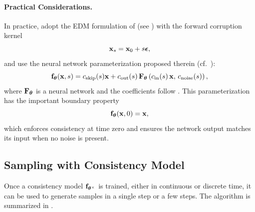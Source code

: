 \paragraph{Practical Considerations.}
In practice, \citet{song2023consistency} adopt the EDM formulation
of \citet{karras2022elucidating} (see ) with the forward corruption
kernel
\[
    {\mathbf{x}}_s = {\mathbf{x}}_0 + s \bm{\epsilon},
\]
and use the neural network parameterization proposed therein
(cf.\ ):
\[
    {\mathbf{f}}_{\bm{\theta}}({\mathbf{x}}, s)
    = c_{\mathrm{skip}}(s) {\mathbf{x}}
      + c_{\mathrm{out}}(s)\,
        {\mathbf{F}}_{\bm{\theta}} \left(c_{\mathrm{in}}(s)\,{\mathbf{x}},\, c_{\mathrm{noise}}(s)\right),
\]
where ${\mathbf{F}}_{\bm{\theta}}$ is a neural network and the coefficients follow
. This parameterization has the important
boundary property
\[
    {\mathbf{f}}_{\bm{\theta}}({\mathbf{x}}, 0) = {\mathbf{x}},
\]
which enforces consistency at time zero and ensures the network output matches
its input when no noise is present.






\subsection{Sampling with Consistency Model}\label{subsec:cm-sampling}
Once a consistency model ${\mathbf{f}}_{\bm{\theta}^\times}$ is trained, either in continuous or discrete time, it can be used to generate samples in a single step or a few steps. The algorithm is summarized in .

